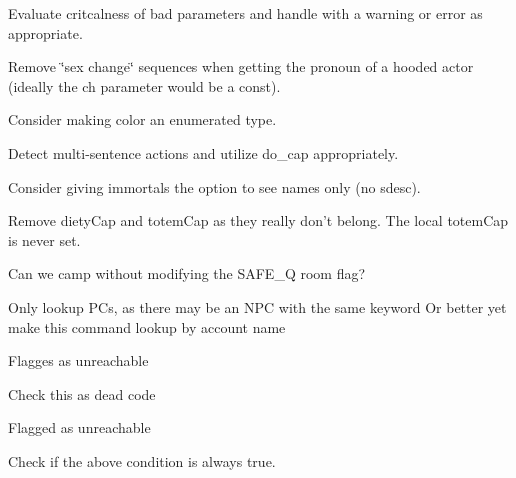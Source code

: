 \begin{DoxyRefList}
Evaluate critcalness of bad parameters and handle with a warning or error as appropriate. 

Remove \char`\"{}sex change\char`\"{} sequences when getting the pronoun of a hooded actor (ideally the {\ttfamily ch} parameter would be a const). 

Consider making {\ttfamily color} an enumerated type. 

Detect multi-\/sentence actions and utilize {\ttfamily do\-\_\-cap} appropriately. 

Consider giving immortals the option to see names only (no sdesc). 

Remove {\ttfamily diety\-Cap} and {\ttfamily totem\-Cap} as they really don't belong. The local {\ttfamily totem\-Cap} is never set.  
\item[\label{todo__todo000004}%
\hypertarget{todo__todo000004}{}%
Member \hyperlink{protos_8h_a870fa263d62eee0d5c14425d181703bf}{delayed\-\_\-camp3} (C\-H\-A\-R\-\_\-\-D\-A\-T\-A $\ast$ch)]Can we camp without modifying the S\-A\-F\-E\-\_\-\-Q room flag?  
\item[\label{todo__todo000021}%
\hypertarget{todo__todo000021}{}%
Member \hyperlink{staff_8cpp_a9542e8d0c593de5b92fc481c973f2995}{do\-\_\-deduct} (C\-H\-A\-R\-\_\-\-D\-A\-T\-A $\ast$ch, char $\ast$argument, int cmd)]Only lookup P\-Cs, as there may be an N\-P\-C with the same keyword Or better yet make this command lookup by account name  
\item[\label{todo__todo000016}%
\hypertarget{todo__todo000016}{}%
Member \hyperlink{commerce_8cpp_aeeba42057b49f2bc245dd8af5b36a3ff}{do\-\_\-pay2} (C\-H\-A\-R\-\_\-\-D\-A\-T\-A $\ast$ch, char $\ast$argument, int cmd)]Flagges as unreachable  
\item[\label{todo__todo000001}%
\hypertarget{todo__todo000001}{}%
Member \hyperlink{protos_8h_a087c3dddea28bb6314e585042098eb07}{do\-\_\-score} (C\-H\-A\-R\-\_\-\-D\-A\-T\-A $\ast$ch, char $\ast$argument, int cmd)]Check this as dead code  
\item[\label{todo__todo000015}%
\hypertarget{todo__todo000015}{}%
Member \hyperlink{protos_8h_a45d44ebdd3bf5adbf54d53f49bd045f0}{do\-\_\-sell} (C\-H\-A\-R\-\_\-\-D\-A\-T\-A $\ast$ch, char $\ast$argument, int cmd)]Flagged as unreachable  
\item[\label{todo__todo000003}%
\hypertarget{todo__todo000003}{}%
Member \hyperlink{protos_8h_a80cf14dea308e129be474dd0faa054e7}{do\-\_\-teach} (C\-H\-A\-R\-\_\-\-D\-A\-T\-A $\ast$ch, char $\ast$argument, int cmd)]Check if the above condition is always true.  

\end{DoxyRefList}
